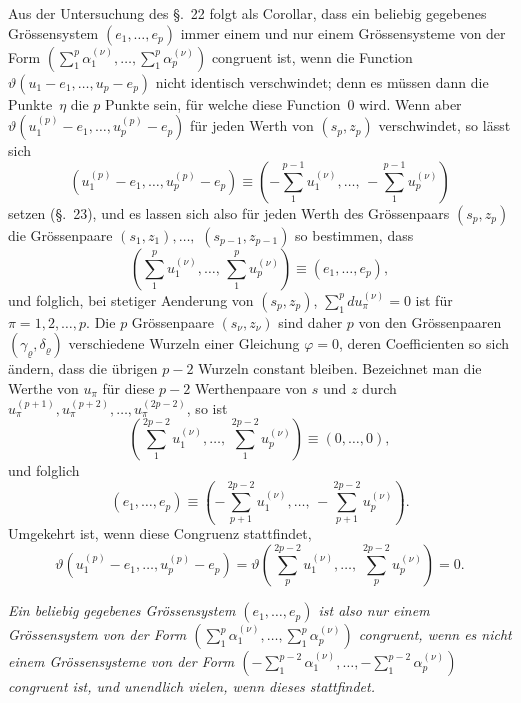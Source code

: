 \documentclass[a4paper,12pt,leqno]{article}
\begin{document}
Aus der Untersuchung des \S.~22 folgt als Corollar, dass ein
beliebig gegebenes Gr\"{o}ssensystem $(e_1,\ldots, e_p)$ immer
einem und nur einem Gr\"{o}ssensysteme von der Form
$( \sum\limits_1^p \alpha_1^{(\nu)},\ldots,
   \sum\limits_1^p \alpha_p^{(\nu)} )$
congruent ist, wenn die Function
$\vartheta( u_1 - e_1,\ldots, u_p - e_p )$
nicht identisch verschwindet; denn es m\"{u}ssen dann die
Punkte~$\eta$ die $p$ Punkte sein, f\"{u}r welche diese
Function~$0$ wird.  Wenn aber
$\vartheta( u_1^{(p)} - e_1,\ldots, u_p^{(p)} - e_p )$
f\"{u}r jeden Werth von $(s_p, z_p)$ verschwindet, so l\"{a}sst
sich
\[ (u_1^{(p)} - e_1,\ldots, u_p^{(p)} - e_p)
   \equiv
         \left(
          - \sum_1^{p - 1} u_1^{(\nu)},\ldots, \,
          - \sum_1^{p - 1} u_p^{(\nu)}
         \right) \]
setzen (\S.~23), und es lassen sich also f\"{u}r jeden Werth des
Gr\"{o}ssenpaars $(s_p, z_p)$ die Gr\"{o}ssenpaare
$(s_1, z_1),\ldots,$ $(s_{p-1}, z_{p-1})$
so bestimmen, dass
\[       \left(
            \sum_1^p u_1^{(\nu)},\ldots, \,
            \sum_1^p u_p^{(\nu)}
         \right)
   \equiv (e_1,\ldots, e_p),\]
und folglich, bei stetiger Aenderung von $(s_p, z_p)$,
$\sum\limits_1^p du_\pi^{(\nu)} = 0$
ist f\"{u}r $\pi = 1,2,\ldots,p$.  Die $p$ Gr\"{o}ssenpaare
$(s_\nu, z_\nu)$ sind daher $p$ von den Gr\"{o}ssenpaaren
$(\gamma_\varrho, \delta_\varrho)$ verschiedene Wurzeln einer
Gleichung $\varphi = 0$, deren Coefficienten so sich \"{a}ndern,
dass die \"{u}brigen $p - 2$ Wurzeln constant bleiben.
Bezeichnet man die Werthe von $u_\pi$ f\"{u}r diese $p - 2$
Werthenpaare von $s$ und $z$ durch
$u_\pi^{(p+1)}, u_\pi^{(p+2)},\ldots, u_\pi^{(2p - 2)}$,
so ist
\[       \left(
            \sum_1^{2p - 2} u_1^{(\nu)},\ldots, \,
            \sum_1^{2p - 2} u_p^{(\nu)}
         \right)
   \equiv (0,\ldots, 0),\]
und folglich
\[ (e_1,\ldots, e_p) \equiv
         \left(
          - \sum_{p+1}^{2p - 2} u_1^{(\nu)},\ldots, \,
          - \sum_{p+1}^{2p - 2} u_p^{(\nu)}
         \right).\]
Umgekehrt ist, wenn diese Congruenz stattfindet,
\[ \vartheta( u_1^{(p)} - e_1,\ldots, u_p^{(p)} - e_p)
   = \vartheta
         \left(
            \sum_p^{2p - 2} u_1^{(\nu)},\ldots, \,
            \sum_p^{2p - 2} u_p^{(\nu)}
         \right)
   = 0.\]

{\itshape
Ein beliebig gegebenes Gr\"{o}ssensystem $(e_1,\ldots, e_p)$ ist
also nur einem Gr\"{o}ssensystem von der Form
$( \sum\limits_1^p \alpha_1^{(\nu)},\ldots,
   \sum\limits_1^p \alpha_p^{(\nu)} )$
congruent, wenn es nicht einem Gr\"{o}ssensysteme von der Form
$( - \sum\limits_1^{p - 2} \alpha_1^{(\nu)},\ldots,
   - \sum\limits_1^{p - 2} \alpha_p^{(\nu)} )$
congruent ist, und unendlich vielen, wenn dieses stattfindet.}
\end{document}

